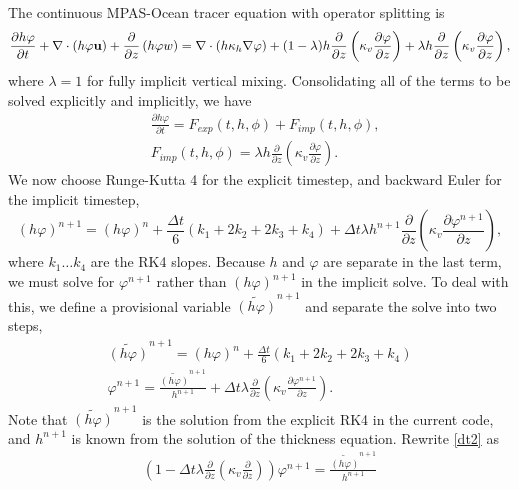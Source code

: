 \documentclass[11pt]{report}
\begin{document}
The continuous MPAS-Ocean tracer equation with operator splitting is
\begin{equation}   
\label{continuous_tracer1}
\frac{\partial h\varphi}{\partial t} 
 + \nabla \cdot \left( h\varphi {\bf u} \right) 
 + \frac{\partial}{\partial z} \left( h\varphi w \right) 
= \nabla\cdot\left(h \kappa_h \nabla\varphi \right)
+ (1-\lambda)h \frac{\partial }{\partial z} 
  \left( \kappa_v \frac{\partial \varphi}{\partial z} \right)
+ \lambda h \frac{\partial }{\partial z} 
  \left( \kappa_v \frac{\partial \varphi}{\partial z} \right),
\end{equation}
where $\lambda=1$ for fully implicit vertical mixing.
Consolidating all of the terms to be solved explicitly and implicitly, we have
\begin{eqnarray}   
\label{continuous_tracer2}
&\displaystyle\frac{\partial h\varphi}{\partial t} 
 = F_{exp}(t,h,\phi) + F_{imp}(t,h,\phi), \\
& F_{imp}(t,h,\phi) = \lambda h \displaystyle\frac{\partial }{\partial z} 
  \left( \kappa_v \frac{\partial \varphi}{\partial z} \right).
\end{eqnarray}
We now choose Runge-Kutta 4 for the explicit timestep, and backward Euler for the implicit timestep,
\begin{equation}   
\label{tracersplit1}
(h\varphi)^{n+1} = (h\varphi)^n 
+ \frac{\Delta t }{6}(k_1 + 2k_2 + 2k_3 + k_4)
+ \Delta t \lambda h^{n+1} \displaystyle\frac{\partial }{\partial z}
  \left( \kappa_v \frac{\partial \varphi^{n+1}}{\partial z} \right),
\end{equation}
where $k_1\ldots k_4$ are the RK4 slopes.  Because $h$ and $\varphi$ are separate in the last term, we must solve for $\varphi^{n+1}$ rather than $(h\varphi)^{n+1}$ in the implicit solve.  To deal with this, we define a provisional variable $\widetilde{(h\varphi)}^{n+1}$ and separate the solve into two steps,
\begin{eqnarray}
\label{dt1}
\widetilde{(h\varphi)}^{n+1} = (h\varphi)^n 
+ \frac{\Delta t }{6}(k_1 + 2k_2 + 2k_3 + k_4)\\
\label{dt2}
\varphi^{n+1} = \frac{\widetilde{(h\varphi)}^{n+1}}{h^{n+1}}
+ \Delta t \lambda \displaystyle\frac{\partial }{\partial z}
  \left( \kappa_v \frac{\partial \varphi^{n+1}}{\partial z} \right).
\end{eqnarray}
Note that $\widetilde{(h\varphi)}^{n+1}$ is the solution from the explicit RK4 in the current code, and $h^{n+1}$ is known from the solution of the thickness equation.  Rewrite \ref{dt2} as
\begin{eqnarray}
\label{dt3}
\left(1- \Delta t \lambda \displaystyle\frac{\partial }{\partial z}
  \left( \kappa_v \frac{\partial}{\partial z} \right)
  \right)\varphi^{n+1} = \frac{\widetilde{(h\varphi)}^{n+1}}{h^{n+1}}
\end{eqnarray}
\end{document}
